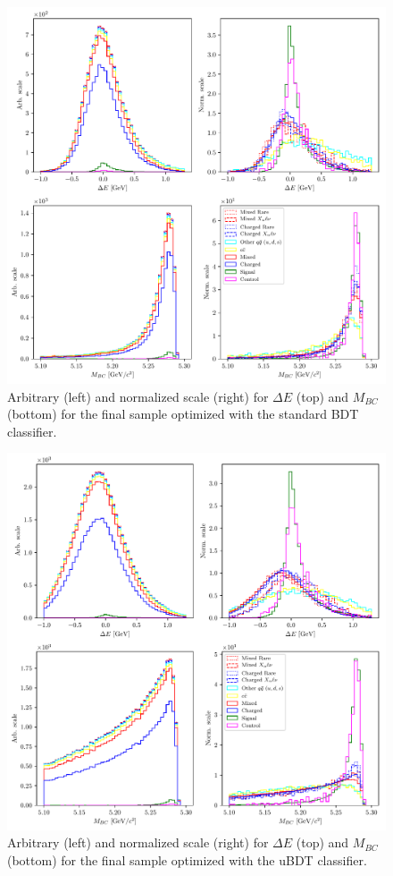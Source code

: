 \documentclass[headings=standardclasses,headings=big,oneside,a4paper,openany,12pt]{scrbook}
\begin{document}
\begin{figure}[H]
\centering
\captionsetup{width=0.8\linewidth}
\includegraphics[width=\linewidth]{fig/opt_01c}
\caption{Arbitrary (left) and normalized scale (right) for $\Delta E$ (top) and $M_{BC}$ (bottom) for the final sample optimized with the standard BDT classifier.}
\label{fig:opt01c}
\end{figure} 

\begin{figure}[H]
\centering
\captionsetup{width=0.8\linewidth}
\includegraphics[width=\linewidth]{fig/opt_1dc}
\caption{Arbitrary (left) and normalized scale (right) for $\Delta E$ (top) and $M_{BC}$ (bottom) for the final sample optimized with the uBDT classifier.}
\label{fig:opt1dc}
\end{figure} 
\end{document}
